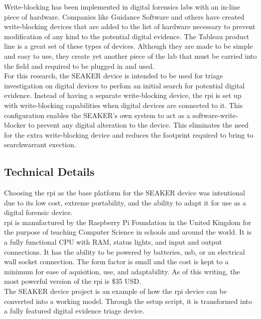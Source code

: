 \documentclass[12pt]{article}
\begin{document}
Write-blocking has been implemented in digital forensics labs with an in-line 
piece of hardware.  Companies like Guidance Software and others have created
write-blocking devices that are added to the list of hardware necessary to 
prevent modification of any kind to the potential digital evidence.  The Tableau
product line is a great set of these types of devices.  Although they are made
to be simple and easy to use, they create yet another piece of the lab that must
be carried into the field and required to be plugged in and used.\\

For this research, the SEAKER device is intended to be used for triage investigation
on digital devices to perfom an initial search for potential digital evidence.
Instead of having a separate write-blocking device, the \gls{rpi} is set up with
write-blocking capabilities when digital devices are connected to it.  This
configuration enables the SEAKER's own system to act as a software-write-blocker
to prevent any digital alteration to the device.  This eliminates the need for 
the extra write-blocking device and reduces the footprint required to bring to
\gls{searchwarrant} exection.\\

\subsection{Technical Details}

Choosing the \gls{rpi} as the base platform for the SEAKER device was intentional
due to its low cost, extreme portability, and the ability to adapt it for use as
a digital forensic device.\\

\gls{rpi} is manufactured by the Raspberry Pi Foundation in the United Kingdom
for the purpose of teaching Computer Science in schools and around the world.  It
is a fully functional CPU with RAM, status lights, and input and output connections.
It has the ability
to be powered by batteries, \gls{usb}, or an electrical wall socket connection.
The form factor is small and the cost is kept to a minimum for ease of
aquisition, use, and adaptability.  As of this writing,
the most powerful version of the \gls{rpi} is \$35 USD.\\

The SEAKER device project is an example of how the \gls{rpi} device
can be converted into a working model.  Through the setup script, it is 
transformed into a fully featured digital evidence triage device.\\
\end{document}
